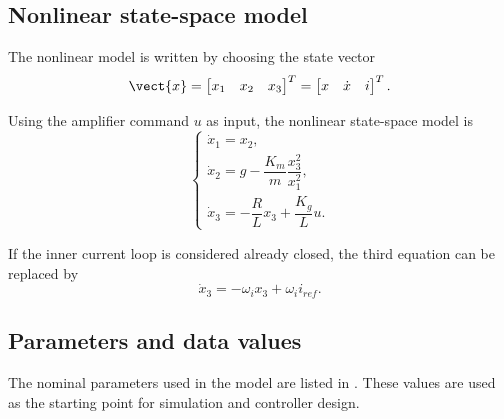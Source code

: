 \subsection{Nonlinear state-space model}

The nonlinear model is written by choosing the state vector
\begin{equation}
    \vect{x} = \begin{bmatrix} x_1 & x_2 & x_3 \end{bmatrix}^T
    = \begin{bmatrix} x & \dot{x} & i \end{bmatrix}^T.
\end{equation}

Using the amplifier command $u$ as input, the nonlinear state-space model is
\begin{equation}
\begin{cases}
    \dot{x}_1 = x_2, \\
    \dot{x}_2 = g - \dfrac{K_m}{m}\dfrac{x_3^2}{x_1^2}, \\
    \dot{x}_3 = -\dfrac{R}{L}x_3 + \dfrac{K_g}{L}u.
\end{cases}
\label{eq:nonlinear_ss}
\end{equation}

If the inner current loop is considered already closed, the third equation can be replaced by
\begin{equation}
    \dot{x}_3 = -\omega_i x_3 + \omega_i i_{ref}.
    \label{eq:current_loop_state}
\end{equation}

\subsection{Parameters and data values}

The nominal parameters used in the model are listed in . These values are used as the starting point for simulation and controller design.

